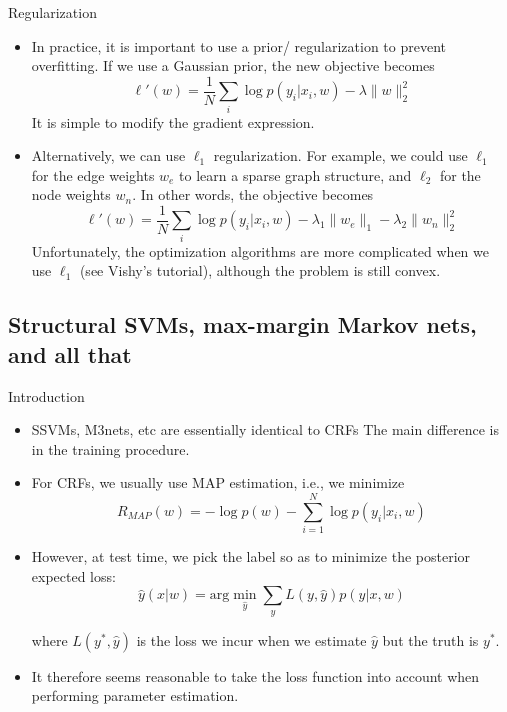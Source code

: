 \documentclass[10pt,mathserif]{beamer}
\begin{document}
\begin{frame}{Regularization}
\begin{itemize}
    \item In practice, it is important to use a prior/ regularization to prevent overfitting. If we use a Gaussian prior, the new objective becomes
    \begin{equation}
        \ell'(w) = \frac{1}{N} \sum_i\log p(y_i|x_i,w) - \lambda\|w\|_2^2
    \end{equation}
    It is simple to modify the gradient expression.
    
    \item Alternatively, we can use $\ell_1$ regularization. For example, we could use $\ell_1$ for the edge weights $w_e$ to learn a sparse graph structure, and $\ell_2$ for the node weights $w_n$. In other words, the objective becomes\begin{equation}
        \ell'(w) = \frac{1}{N} \sum_i\log p(y_i|x_i,w) - \lambda_1\|w_e\|_1 - \lambda_2\|w_n\|_2^2
    \end{equation}
    Unfortunately, the optimization algorithms are more complicated when we use $\ell_1$ (see Vishy's tutorial), although the problem is still convex. 
\end{itemize}
\end{frame}

         
\subsection{Structural SVMs, max-margin Markov nets, and all that}
\begin{frame}{Introduction}
\begin{itemize}
    \item SSVMs, M3nets, etc are essentially identical to CRFs The main difference is in the training procedure.
    \item For CRFs, we usually use MAP estimation, i.e., we minimize
    \begin{equation}
        R_{MAP} (w) = - \log p(w) - \sum_{i=1}^N \log p(y_i |x_i , w)
    \end{equation}
    
    \item However, at test time, we pick the label so as to minimize the posterior expected loss:
    \begin{equation}
        \hat{y}(x|w) =\text{arg}\min_{\hat{y}}\sum_y L(y, \hat{y})p(y|x, w)
    \end{equation}
    
    where $L(y^*, \hat{y})$ is the loss we incur when we estimate $\hat{y}$ but the truth is $y^*$.
    \item It therefore seems reasonable to take the loss function into account when performing parameter estimation.
\end{itemize}
\end{frame}
\end{document}
